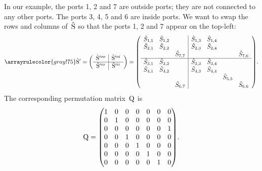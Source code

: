 In our example, the ports 1, 2 and 7 are outside ports; they are not connected to any other ports.
The ports 3, 4, 5 and 6 are inside ports.
We want to swap the rows and columns of~$\hat{\mathrm{S}}$ so that the ports 1, 2 and 7 appear on the top-left:
\begin{equation}
    \arrayrulecolor{gray!75}
    \matrcp{S}'
    =
    \left(
    \begin{array}{c|c}
        \matrcp{S}'^{oo} & \matrcp{S}'^{oi} \\
        \hline
        \matrcp{S}'^{io} & \matrcp{S}'^{ii} \\
    \end{array}
    \right)
    =
    \left(
    \begin{array}{ccc|cccc}
        \cp{S}_{1,1} & \cp{S}_{1,2} &              & \cp{S}_{1,3} & \cp{S}_{1,4} &              &              \\
        \cp{S}_{2,1} & \cp{S}_{2,2} &              & \cp{S}_{2,3} & \cp{S}_{2,4} &              &              \\
                     &              & \cp{S}_{7,7} &              &              &              & \cp{S}_{7,6} \\
        \hline
        \cp{S}_{3,1} & \cp{S}_{3,2} &              & \cp{S}_{3,3} & \cp{S}_{3,4} &              &              \\
        \cp{S}_{4,1} & \cp{S}_{4,2} &              & \cp{S}_{4,3} & \cp{S}_{4,4} &              &              \\
                     &              &              &              &              & \cp{S}_{5,5} &              \\
                     &              & \cp{S}_{6,7} &              &              &              & \cp{S}_{6,6} \\
    \end{array}
    \right)
    \text{.}
    \label{eq:implementation_4}
\end{equation}
The corresponding permutation matrix~$\mathrm{Q}$ is
\begin{equation}
    \matr{Q} =
    \begin{pmatrix}
        1  &  0  &  0  &  0  &  0  &  0  &  0  \\
        0  &  1  &  0  &  0  &  0  &  0  &  0  \\
        0  &  0  &  0  &  0  &  0  &  0  &  1  \\
        0  &  0  &  1  &  0  &  0  &  0  &  0  \\
        0  &  0  &  0  &  1  &  0  &  0  &  0  \\
        0  &  0  &  0  &  0  &  1  &  0  &  0  \\
        0  &  0  &  0  &  0  &  0  &  1  &  0  \\
    \end{pmatrix}
    \text{.}
    \label{eq:implementation_5}
\end{equation}


